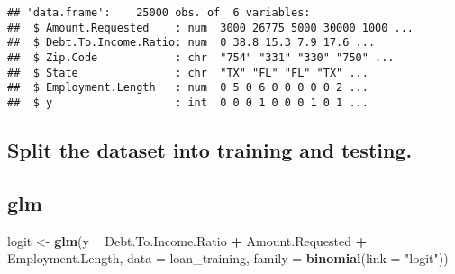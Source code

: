 \documentclass[]{article}
\newenvironment{Shaded}{\begin{snugshade}}{\end{snugshade}}
\newcommand{\KeywordTok}[1]{\textcolor[rgb]{0.13,0.29,0.53}{\textbf{#1}}}
\newcommand{\DataTypeTok}[1]{\textcolor[rgb]{0.13,0.29,0.53}{#1}}
\newcommand{\DecValTok}[1]{\textcolor[rgb]{0.00,0.00,0.81}{#1}}
\newcommand{\StringTok}[1]{\textcolor[rgb]{0.31,0.60,0.02}{#1}}
\newcommand{\OtherTok}[1]{\textcolor[rgb]{0.56,0.35,0.01}{#1}}
\newcommand{\OperatorTok}[1]{\textcolor[rgb]{0.81,0.36,0.00}{\textbf{#1}}}
\newcommand{\NormalTok}[1]{#1}
\begin{document}
\begin{verbatim}
## 'data.frame':    25000 obs. of  6 variables:
##  $ Amount.Requested    : num  3000 26775 5000 30000 1000 ...
##  $ Debt.To.Income.Ratio: num  0 38.8 15.3 7.9 17.6 ...
##  $ Zip.Code            : chr  "754" "331" "330" "750" ...
##  $ State               : chr  "TX" "FL" "FL" "TX" ...
##  $ Employment.Length   : num  0 5 0 6 0 0 0 0 0 2 ...
##  $ y                   : int  0 0 0 1 0 0 0 1 0 1 ...
\end{verbatim}

\subsection{Split the dataset into training and
testing.}\label{split-the-dataset-into-training-and-testing.-1}

\begin{Shaded}
\end{Shaded}

\subsection{glm}\label{glm}

\begin{Shaded}
\begin{Highlighting}[]
\NormalTok{logit <-}\StringTok{ }\KeywordTok{glm}\NormalTok{(y }\OperatorTok{~}\StringTok{ }\NormalTok{Debt.To.Income.Ratio }\OperatorTok{+}\StringTok{ }\NormalTok{Amount.Requested }\OperatorTok{+}\StringTok{ }\NormalTok{Employment.Length, }\DataTypeTok{data =}\NormalTok{ loan_training, }\DataTypeTok{family =} \KeywordTok{binomial}\NormalTok{(}\DataTypeTok{link =} \StringTok{"logit"}\NormalTok{))}
\end{Highlighting}
\end{Shaded}
\end{document}
